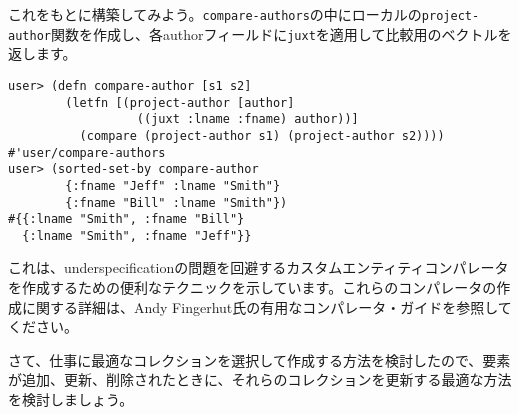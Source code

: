 これをもとに構築してみよう。\texttt{compare-authors}の中にローカルの\texttt{project-author}関数を作成し、各authorフィールドに\texttt{juxt}を適用して比較用のベクトルを返します。

\begin{lstlisting}[numbers=none]
user> (defn compare-author [s1 s2]
        (letfn [(project-author [author]
                  ((juxt :lname :fname) author))]
          (compare (project-author s1) (project-author s2))))
#'user/compare-authors
user> (sorted-set-by compare-author
        {:fname "Jeff" :lname "Smith"}
        {:fname "Bill" :lname "Smith"})
#{{:lname "Smith", :fname "Bill"}
  {:lname "Smith", :fname "Jeff"}}
\end{lstlisting}

これは、underspecificationの問題を回避するカスタムエンティティコンパレータを作成するための便利なテクニックを示しています。これらのコンパレータの作成に関する詳細は、Andy Fingerhut氏の有用なコンパレータ・ガイドを参照してください。

さて、仕事に最適なコレクションを選択して作成する方法を検討したので、要素が追加、更新、削除されたときに、それらのコレクションを更新する最適な方法を検討しましょう。

